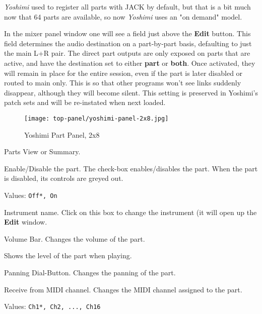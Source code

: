    \textsl{Yoshimi} used to register all parts with JACK by default, but that
   is a bit much now that 64 parts are available, so now \textsl{Yoshimi}
   uses an "on demand" model.

   In the mixer panel window one will see a field just above the
   \textbf{Edit} button.
   This field determines the audio destination on a part-by-part basis,
   defaulting to just the main L+R pair. The direct part outputs are only
   exposed on parts that are active, and have the destination set to either
   \textbf{part} or \textbf{both}.
   Once activated, they will remain in place for the entire session, even if
   the part is later disabled or routed to main only. This is so that other
   programs won't see links suddenly disappear, although they will become
   silent.  This setting is preserved in Yoshimi's patch sets and will be
   re-instated when next loaded.

\begin{figure}[H]
   \centering 
   \texttt{[image: top-panel/yoshimi-panel-2x8.jpg]}
   \caption[Yoshimi Part Panel]{Yoshimi Part Panel, 2x8}
   \label{fig:yoshimi_part_panel_2x8}
\end{figure}

   \setcounter{ItemCounter}{0}      %

   Parts View or Summary.

   Enable/Disable the part. The check-box enables/disables the part.
   When the part is disabled, its controls are greyed out.

   Values: \texttt{Off*, On}

   Instrument name. Click on this box to change the instrument (it will
   open up the \textbf{Edit} window.

   Volume Bar.
   Changes the volume of the part.

   Shows the level of the part when playing.

   Panning Dial-Button.
   Changes the panning of the part.

   Receive from MIDI channel.
   Changes the MIDI channel assigned to the part.

   Values: \texttt{Ch1*, Ch2, ..., Ch16}

